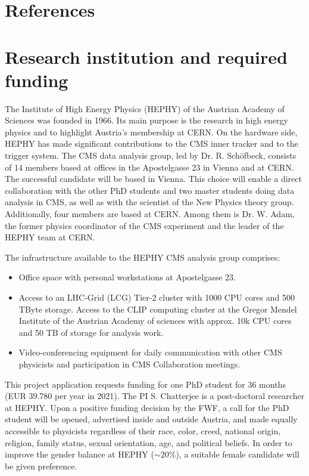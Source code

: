 \documentclass[a4paper,11pt]{article}
\begin{document}
\appendix
\renewcommand{\thesection}{Annex \arabic{section}} 

\clearpage
\section{References}
\renewcommand{\refname}{}
{
%


}

\newpage

\section{Research institution and required funding}

The Institute of High Energy Physics (HEPHY) of the Austrian Academy of Sciences was founded in 1966. 
Its main purpose is the research in high energy physics and to highlight Austria's membership at CERN. 
On the hardware side, HEPHY has made significant contributions to the CMS inner tracker and to the trigger system. 
The CMS data analysis group, led by Dr. R. Sch{\"o}fbeck, consists of 14 members based at offices in the Apostelgasse 23 in Vienna and at CERN. The successful candidate will be based in Vienna. 
This choice will enable a direct collaboration with the other PhD students and two master students doing data analysis in CMS, as well as with the scientist of the New Physics theory group.
Additionally, four members are based at CERN. 
Among them is Dr. W. Adam, the former physics coordinator of the CMS experiment and the leader of the HEPHY team at CERN.

The infrastructure available to the HEPHY CMS analysis group comprises:
\begin{itemize}
\item Office space with personal workstations at Apostelgasse 23.
\item Access to an LHC-Grid (LCG) Tier-2 cluster with 1000 CPU cores and 500 TByte storage. Access to the CLIP computing cluster at the Gregor Mendel Institute of the Austrian Academy of sciences with approx. 10k CPU cores and 50 TB of
storage for analysis work.
\item Video-conferencing equipment for daily communication with other CMS physicists and participation in CMS Collaboration meetings.
\end{itemize}

This project application requests funding for one PhD student for 36
months (EUR 39.780 per year in 2021). 
The PI S. Chatterjee is a post-doctoral researcher at HEPHY.
Upon a positive funding decision by the FWF, a call for the PhD student will be opened, advertised inside and outside Austria, and made equally accessible to physicists regardless of their race, color, creed, national origin, religion, family status, sexual orientation, age, and political beliefs. 
In order to improve the gender balance at HEPHY ($\sim 20\%$), a suitable female candidate will be given preference.
\end{document}
